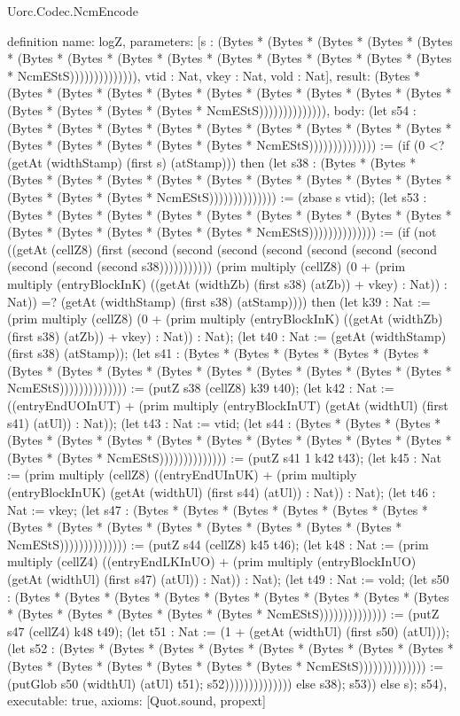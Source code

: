 \begin{lexlean}{Uorc.Codec.NcmEncode}
\begin{semanticmodule}
definition{
  name: logZ,
  parameters: [s : (Bytes * (Bytes * (Bytes * (Bytes * (Bytes * (Bytes * (Bytes * (Bytes * (Bytes * (Bytes * (Bytes * (Bytes * (Bytes * (Bytes * NcmEStS)))))))))))))), vtid : Nat, vkey : Nat, vold : Nat],
  result: (Bytes * (Bytes * (Bytes * (Bytes * (Bytes * (Bytes * (Bytes * (Bytes * (Bytes * (Bytes * (Bytes * (Bytes * (Bytes * (Bytes * NcmEStS)))))))))))))),
  body: (let s54 : (Bytes * (Bytes * (Bytes * (Bytes * (Bytes * (Bytes * (Bytes * (Bytes * (Bytes * (Bytes * (Bytes * (Bytes * (Bytes * (Bytes * NcmEStS)))))))))))))) := (if (0 <? (getAt (widthStamp) (first s) (atStamp))) then (let s38 : (Bytes * (Bytes * (Bytes * (Bytes * (Bytes * (Bytes * (Bytes * (Bytes * (Bytes * (Bytes * (Bytes * (Bytes * (Bytes * (Bytes * NcmEStS)))))))))))))) := (zbase s vtid); (let s53 : (Bytes * (Bytes * (Bytes * (Bytes * (Bytes * (Bytes * (Bytes * (Bytes * (Bytes * (Bytes * (Bytes * (Bytes * (Bytes * (Bytes * NcmEStS)))))))))))))) := (if (not ((getAt (cellZ8) (first (second (second (second (second (second (second (second (second (second (second s38))))))))))) (prim multiply (cellZ8) (0 + (prim multiply (entryBlockInK) ((getAt (widthZb) (first s38) (atZb)) + vkey) : Nat)) : Nat)) =? (getAt (widthStamp) (first s38) (atStamp)))) then (let k39 : Nat := (prim multiply (cellZ8) (0 + (prim multiply (entryBlockInK) ((getAt (widthZb) (first s38) (atZb)) + vkey) : Nat)) : Nat); (let t40 : Nat := (getAt (widthStamp) (first s38) (atStamp)); (let s41 : (Bytes * (Bytes * (Bytes * (Bytes * (Bytes * (Bytes * (Bytes * (Bytes * (Bytes * (Bytes * (Bytes * (Bytes * (Bytes * (Bytes * NcmEStS)))))))))))))) := (putZ s38 (cellZ8) k39 t40); (let k42 : Nat := ((entryEndUOInUT) + (prim multiply (entryBlockInUT) (getAt (widthUl) (first s41) (atUl)) : Nat)); (let t43 : Nat := vtid; (let s44 : (Bytes * (Bytes * (Bytes * (Bytes * (Bytes * (Bytes * (Bytes * (Bytes * (Bytes * (Bytes * (Bytes * (Bytes * (Bytes * (Bytes * NcmEStS)))))))))))))) := (putZ s41 1 k42 t43); (let k45 : Nat := (prim multiply (cellZ8) ((entryEndUInUK) + (prim multiply (entryBlockInUK) (getAt (widthUl) (first s44) (atUl)) : Nat)) : Nat); (let t46 : Nat := vkey; (let s47 : (Bytes * (Bytes * (Bytes * (Bytes * (Bytes * (Bytes * (Bytes * (Bytes * (Bytes * (Bytes * (Bytes * (Bytes * (Bytes * (Bytes * NcmEStS)))))))))))))) := (putZ s44 (cellZ8) k45 t46); (let k48 : Nat := (prim multiply (cellZ4) ((entryEndLKInUO) + (prim multiply (entryBlockInUO) (getAt (widthUl) (first s47) (atUl)) : Nat)) : Nat); (let t49 : Nat := vold; (let s50 : (Bytes * (Bytes * (Bytes * (Bytes * (Bytes * (Bytes * (Bytes * (Bytes * (Bytes * (Bytes * (Bytes * (Bytes * (Bytes * (Bytes * NcmEStS)))))))))))))) := (putZ s47 (cellZ4) k48 t49); (let t51 : Nat := (1 + (getAt (widthUl) (first s50) (atUl))); (let s52 : (Bytes * (Bytes * (Bytes * (Bytes * (Bytes * (Bytes * (Bytes * (Bytes * (Bytes * (Bytes * (Bytes * (Bytes * (Bytes * (Bytes * NcmEStS)))))))))))))) := (putGlob s50 (widthUl) (atUl) t51); s52)))))))))))))) else s38); s53)) else s); s54),
  executable: true,
  axioms: [Quot.sound, propext]
}


\end{semanticmodule}
\end{lexlean}
